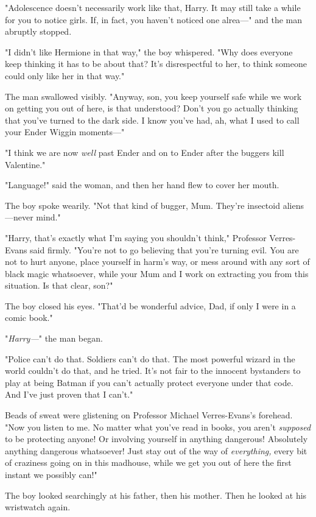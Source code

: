 "Adolescence doesn't necessarily work like that, Harry. It may still take a 
while for you to notice girls. If, in fact, you haven't noticed one alrea---" and 
the man abruptly stopped.

"I didn't like Hermione in that way," the boy whispered. "Why does everyone 
keep thinking it has to be about that? It's disrespectful to her, to think 
someone could only like her in that way."

The man swallowed visibly. "Anyway, son, you keep yourself safe while we work 
on getting you out of here, is that understood? Don't you go actually thinking 
that you've turned to the dark side. I know you've had, ah, what I used to call 
your Ender Wiggin moments---"

"I think we are now \emph{well} past Ender and on to Ender after the buggers 
kill Valentine."

"Language!" said the woman, and then her hand flew to cover her mouth.

The boy spoke wearily. "Not that kind of bugger, Mum. They're insectoid 
aliens---never mind."

"Harry, that's exactly what I'm saying you shouldn't think," Professor 
Verres-Evans said firmly. "You're not to go believing that you're turning evil. 
You are not to hurt anyone, place yourself in harm's way, or mess around with 
any sort of black magic whatsoever, while your Mum and I work on extracting you 
from this situation. Is that clear, son?"

The boy closed his eyes. "That'd be wonderful advice, Dad, if only I were in a 
comic book."

"\emph{Harry---}" the man began.

"Police can't do that. Soldiers can't do that. The most powerful wizard in the 
world couldn't do that, and he tried. It's not fair to the innocent bystanders 
to play at being Batman if you can't actually protect everyone under that code. 
And I've just proven that I can't."

Beads of sweat were glistening on Professor Michael Verres-Evans's forehead. 
"Now you listen to me. No matter what you've read in books, you aren't 
\emph{supposed} to be protecting anyone! Or involving yourself in anything 
dangerous! Absolutely anything dangerous whatsoever! Just stay out of the way 
of \emph{everything,} every bit of craziness going on in this madhouse, while 
we get you out of here the first instant we possibly can!"

The boy looked searchingly at his father, then his mother. Then he looked at 
his wristwatch again.

